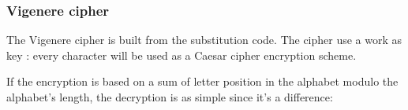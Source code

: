 \subsubsection{ Vigenere cipher }

The  Vigenere cipher is built from the substitution code. The cipher use a work as key : every character will be used as a Caesar cipher encryption scheme. 

\begin{table}[ht!]
    \centering
	\caption{Exemple of a encryption using the vigenere code}
	\label{tab:ExempleVigenereEncryption}
\end{table}

If the encryption is based on a sum of letter position in the alphabet modulo the alphabet's length, the decryption is as simple since it's a difference: 

\begin{table}[ht!]
    \centering
	\caption{Exemple of a decryption using the vigenere code}
	\label{tab:ExempleVigenereDecryption}
\end{table}



